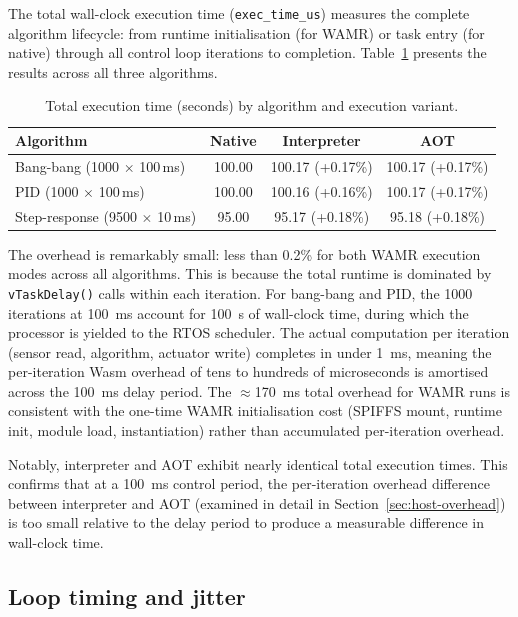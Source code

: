 \documentclass[12pt, a4paper]{report}
\begin{document}
The total wall-clock execution time (\texttt{exec\_time\_us}) measures the complete algorithm lifecycle: from runtime initialisation (for WAMR) or task entry (for native) through all control loop iterations to completion. Table~\ref{tab:exec-time} presents the results across all three algorithms.

\begin{table}[htbp]
\centering
\caption{Total execution time (seconds) by algorithm and execution variant.}
\label{tab:exec-time}
\small
\begin{tabular}{@{}lccc@{}}
\toprule
\textbf{Algorithm} & \textbf{Native} & \textbf{Interpreter} & \textbf{AOT} \\
\midrule
Bang-bang (1000 $\times$ 100\,ms) & 100.00 & 100.17 (+0.17\%) & 100.17 (+0.17\%) \\
PID (1000 $\times$ 100\,ms) & 100.00 & 100.16 (+0.16\%) & 100.17 (+0.17\%) \\
Step-response (9500 $\times$ 10\,ms) & 95.00 & 95.17 (+0.18\%) & 95.18 (+0.18\%) \\
\bottomrule
\end{tabular}
\end{table}

The overhead is remarkably small: less than 0.2\% for both WAMR execution modes across all algorithms. This is because the total runtime is dominated by \texttt{vTaskDelay()} calls within each iteration. For bang-bang and PID, the 1000 iterations at 100~ms account for 100~s of wall-clock time, during which the processor is yielded to the RTOS scheduler. The actual computation per iteration (sensor read, algorithm, actuator write) completes in under 1~ms, meaning the per-iteration Wasm overhead of tens to hundreds of microseconds is amortised across the 100~ms delay period. The $\approx$170~ms total overhead for WAMR runs is consistent with the one-time WAMR initialisation cost (SPIFFS mount, runtime init, module load, instantiation) rather than accumulated per-iteration overhead.

Notably, interpreter and AOT exhibit nearly identical total execution times. This confirms that at a 100~ms control period, the per-iteration overhead difference between interpreter and AOT (examined in detail in Section~\ref{sec:host-overhead}) is too small relative to the delay period to produce a measurable difference in wall-clock time.

\subsection{Loop timing and jitter}
\label{sec:loop-timing}
\end{document}
